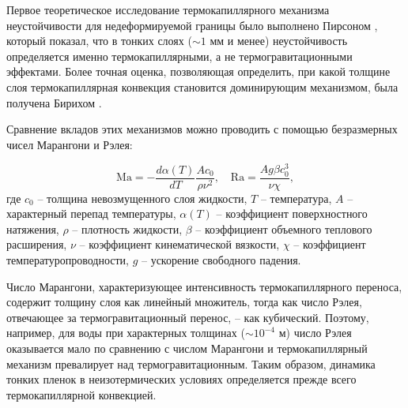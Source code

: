 \documentclass[12pt,a4paper]{article}
\begin{document}


 Первое теоретическое исследование термокапиллярного механизма неустойчивости для недеформируемой границы было выполнено Пирсоном \cite{Pearson1958}, который показал, что в тонких слоях ($ \sim 1 $ мм и менее) неустойчивость определяется именно термокапиллярными, а не термогравитационными эффектами. Более точная оценка, позволяющая определить, при какой толщине слоя термокапиллярная конвекция становится доминирующим механизмом, была получена Бирихом \cite{Birikh1966}. 
 
 Сравнение вкладов этих механизмов можно проводить с помощью безразмерных чисел Марангони и Рэлея:
 
 
 \[
 \mathrm{Ma} = - \frac{d \alpha(T)}{d T}  \frac{A c_0}{\rho \nu^2}, \quad \mathrm{Ra} = \frac{A g \beta  c_0^3}{\nu \chi},
 \]
 где $c_0$ -- толщина невозмущенного слоя жидкости, $T$ -- температура, $A$ -- характерный перепад температуры, $\alpha(T)$ -- коэффициент поверхностного натяжения, $\rho$ -- плотность жидкости, $\beta$ -- коэффициент объемного теплового расширения, $\nu$ -- коэффициент кинематической вязкости, $\chi$ -- коэффициент температуропроводности, $g$ -- ускорение свободного падения. 
 
Число Марангони, характеризующее интенсивность термокапиллярного переноса, содержит толщину слоя как линейный множитель, тогда как число Рэлея, отвечающее за термогравитационный перенос, -- как кубический. Поэтому, например, для воды при характерных толщинах ($\sim 10^{-4} $ м) число Рэлея оказывается мало по сравнению с числом Марангони и термокапиллярный механизм превалирует над термогравитационным. Таким образом, динамика тонких пленок в неизотермических условиях определяется прежде всего термокапиллярной конвекцией. 
\end{document}
